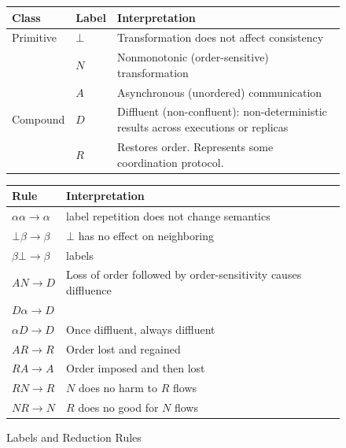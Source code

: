 \begin{figure}[t]
\begin{minipage}{.63\textwidth}
\footnotesize

\begin{tabular}{|l|l|p{7cm}|}
\hline
Class & Label & Interpretation \\ \hline
Primitive & $\bot$ & Transformation does not affect consistency \\ \cline{2-3}
& $N$ & Nonmonotonic (order-sensitive) transformation \\ \cline{2-3}
& $A$ & Asynchronous (unordered) communication \\ \hline
Compound & $D$ & Diffluent (non-confluent): non-deterministic results across executions or replicas \\ \cline{2-3}
& $R$ & Restores order.  Represents some coordination protocol. \\ \hline

\end{tabular}




\end{minipage}
\begin{minipage}{.35\textwidth}
\raggedleft

\footnotesize
\begin{tabular}{|l|p{4cm}|}
\hline
Rule & Interpretation \\ \hline
$\alpha\alpha \rightarrow \alpha$ & label repetition does not change semantics \\ \hline
$\bot \beta \rightarrow \beta$ & $\bot$ has no effect on neighboring \\
$\beta \bot \rightarrow \beta$ & labels\\ \hline
$AN \rightarrow D$ & Loss of order followed by order-sensitivity causes diffluence \\ \hline
$D \alpha \rightarrow D$ & \\
$\alpha D \rightarrow D$ & Once diffluent, always diffluent\\ \hline
$AR \rightarrow R$ & Order lost and regained \\ \hline
$RA \rightarrow A$ & Order imposed and then lost \\ \hline
$RN \rightarrow R$ & $N$ does no harm to $R$ flows \\ \hline
$NR \rightarrow N$ & $R$ does no good for $N$ flows \\ \hline

\end{tabular}
\end{minipage}
\caption{Labels and Reduction Rules}
\label{fig:rules}
\end{figure}

